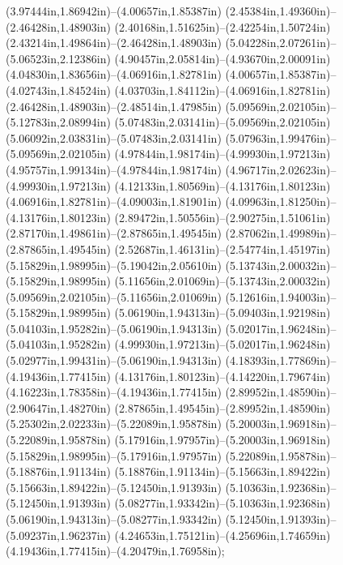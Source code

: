 (3.97444in,1.86942in)--(4.00657in,1.85387in) (2.45384in,1.49360in)--(2.46428in,1.48903in) (2.40168in,1.51625in)--(2.42254in,1.50724in) (2.43214in,1.49864in)--(2.46428in,1.48903in) (5.04228in,2.07261in)--(5.06523in,2.12386in) (4.90457in,2.05814in)--(4.93670in,2.00091in) (4.04830in,1.83656in)--(4.06916in,1.82781in) (4.00657in,1.85387in)--(4.02743in,1.84524in) (4.03703in,1.84112in)--(4.06916in,1.82781in) (2.46428in,1.48903in)--(2.48514in,1.47985in) (5.09569in,2.02105in)--(5.12783in,2.08994in) (5.07483in,2.03141in)--(5.09569in,2.02105in) (5.06092in,2.03831in)--(5.07483in,2.03141in) (5.07963in,1.99476in)--(5.09569in,2.02105in) (4.97844in,1.98174in)--(4.99930in,1.97213in) (4.95757in,1.99134in)--(4.97844in,1.98174in) (4.96717in,2.02623in)--(4.99930in,1.97213in) (4.12133in,1.80569in)--(4.13176in,1.80123in) (4.06916in,1.82781in)--(4.09003in,1.81901in) (4.09963in,1.81250in)--(4.13176in,1.80123in) (2.89472in,1.50556in)--(2.90275in,1.51061in) (2.87170in,1.49861in)--(2.87865in,1.49545in) (2.87062in,1.49989in)--(2.87865in,1.49545in) (2.52687in,1.46131in)--(2.54774in,1.45197in) (5.15829in,1.98995in)--(5.19042in,2.05610in) (5.13743in,2.00032in)--(5.15829in,1.98995in) (5.11656in,2.01069in)--(5.13743in,2.00032in) (5.09569in,2.02105in)--(5.11656in,2.01069in) (5.12616in,1.94003in)--(5.15829in,1.98995in) (5.06190in,1.94313in)--(5.09403in,1.92198in) (5.04103in,1.95282in)--(5.06190in,1.94313in) (5.02017in,1.96248in)--(5.04103in,1.95282in) (4.99930in,1.97213in)--(5.02017in,1.96248in) (5.02977in,1.99431in)--(5.06190in,1.94313in) (4.18393in,1.77869in)--(4.19436in,1.77415in) (4.13176in,1.80123in)--(4.14220in,1.79674in) (4.16223in,1.78358in)--(4.19436in,1.77415in) (2.89952in,1.48590in)--(2.90647in,1.48270in) (2.87865in,1.49545in)--(2.89952in,1.48590in) (5.25302in,2.02233in)--(5.22089in,1.95878in) (5.20003in,1.96918in)--(5.22089in,1.95878in) (5.17916in,1.97957in)--(5.20003in,1.96918in) (5.15829in,1.98995in)--(5.17916in,1.97957in) (5.22089in,1.95878in)--(5.18876in,1.91134in) (5.18876in,1.91134in)--(5.15663in,1.89422in) (5.15663in,1.89422in)--(5.12450in,1.91393in) (5.10363in,1.92368in)--(5.12450in,1.91393in) (5.08277in,1.93342in)--(5.10363in,1.92368in) (5.06190in,1.94313in)--(5.08277in,1.93342in) (5.12450in,1.91393in)--(5.09237in,1.96237in) (4.24653in,1.75121in)--(4.25696in,1.74659in) (4.19436in,1.77415in)--(4.20479in,1.76958in);
